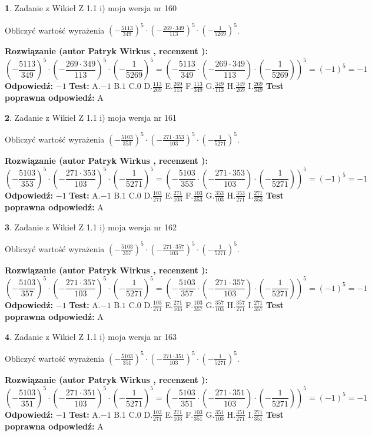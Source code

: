 \documentclass[12pt, a4paper]{article}
\theoremstyle{definition} %
\newtheorem{zad}{}
\newcommand{\zadStart}[1]{\begin{zad}#1\newline}
\newcommand{\zadStop}{\end{zad}}
\newcommand{\rozwStart}[2]{\noindent \textbf{Rozwiązanie (autor #1 , recenzent #2): }\newline}
\newcommand{\rozwStop}{\newline}
\newcommand{\odpStart}{\noindent \textbf{Odpowiedź:}\newline}
\newcommand{\odpStop}{\newline}
\newcommand{\testStart}{\noindent \textbf{Test:}\newline}
\newcommand{\testStop}{\newline}
\newcommand{\kluczStart}{\noindent \textbf{Test poprawna odpowiedź:}\newline}
\newcommand{\kluczStop}{\newline}
\begin{document}
\zadStart{Zadanie z Wikieł Z 1.1 i) moja wersja nr 160}

Obliczyć wartość wyrażenia $(-\frac{5113}{349})^{5} \cdot (-\frac{269 \cdot 349}{113})^{5} \cdot (-\frac{1}{5269})^{5}$.
\zadStop
\rozwStart{Patryk Wirkus}{}
$$(-\frac{5113}{349})^{5} \cdot (-\frac{269 \cdot 349}{113})^{5} \cdot (-\frac{1}{5269})^{5} = (-\frac{5113}{349} \cdot (-\frac{269 \cdot 349}{113}) \cdot (-\frac{1}{5269}))^{5} = (-1)^{5} = -1$$
\rozwStop
\odpStart
$-1$
\odpStop
\testStart
A.$-1$ B.$1$ C.$0$ D.$\frac{113}{269}$ E.$\frac{269}{113}$
F.$\frac{113}{349}$ G.$\frac{349}{113}$
H.$\frac{349}{269}$
I.$\frac{269}{349}$
\testStop
\kluczStart
A
\kluczStop



\zadStart{Zadanie z Wikieł Z 1.1 i) moja wersja nr 161}

Obliczyć wartość wyrażenia $(-\frac{5103}{353})^{5} \cdot (-\frac{271 \cdot 353}{103})^{5} \cdot (-\frac{1}{5271})^{5}$.
\zadStop
\rozwStart{Patryk Wirkus}{}
$$(-\frac{5103}{353})^{5} \cdot (-\frac{271 \cdot 353}{103})^{5} \cdot (-\frac{1}{5271})^{5} = (-\frac{5103}{353} \cdot (-\frac{271 \cdot 353}{103}) \cdot (-\frac{1}{5271}))^{5} = (-1)^{5} = -1$$
\rozwStop
\odpStart
$-1$
\odpStop
\testStart
A.$-1$ B.$1$ C.$0$ D.$\frac{103}{271}$ E.$\frac{271}{103}$
F.$\frac{103}{353}$ G.$\frac{353}{103}$
H.$\frac{353}{271}$
I.$\frac{271}{353}$
\testStop
\kluczStart
A
\kluczStop



\zadStart{Zadanie z Wikieł Z 1.1 i) moja wersja nr 162}

Obliczyć wartość wyrażenia $(-\frac{5103}{357})^{5} \cdot (-\frac{271 \cdot 357}{103})^{5} \cdot (-\frac{1}{5271})^{5}$.
\zadStop
\rozwStart{Patryk Wirkus}{}
$$(-\frac{5103}{357})^{5} \cdot (-\frac{271 \cdot 357}{103})^{5} \cdot (-\frac{1}{5271})^{5} = (-\frac{5103}{357} \cdot (-\frac{271 \cdot 357}{103}) \cdot (-\frac{1}{5271}))^{5} = (-1)^{5} = -1$$
\rozwStop
\odpStart
$-1$
\odpStop
\testStart
A.$-1$ B.$1$ C.$0$ D.$\frac{103}{271}$ E.$\frac{271}{103}$
F.$\frac{103}{357}$ G.$\frac{357}{103}$
H.$\frac{357}{271}$
I.$\frac{271}{357}$
\testStop
\kluczStart
A
\kluczStop



\zadStart{Zadanie z Wikieł Z 1.1 i) moja wersja nr 163}

Obliczyć wartość wyrażenia $(-\frac{5103}{351})^{5} \cdot (-\frac{271 \cdot 351}{103})^{5} \cdot (-\frac{1}{5271})^{5}$.
\zadStop
\rozwStart{Patryk Wirkus}{}
$$(-\frac{5103}{351})^{5} \cdot (-\frac{271 \cdot 351}{103})^{5} \cdot (-\frac{1}{5271})^{5} = (-\frac{5103}{351} \cdot (-\frac{271 \cdot 351}{103}) \cdot (-\frac{1}{5271}))^{5} = (-1)^{5} = -1$$
\rozwStop
\odpStart
$-1$
\odpStop
\testStart
A.$-1$ B.$1$ C.$0$ D.$\frac{103}{271}$ E.$\frac{271}{103}$
F.$\frac{103}{351}$ G.$\frac{351}{103}$
H.$\frac{351}{271}$
I.$\frac{271}{351}$
\testStop
\kluczStart
A
\kluczStop
\end{document}
